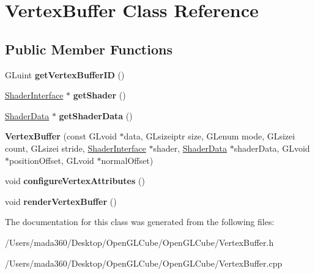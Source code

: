 \hypertarget{class_vertex_buffer}{}\section{Vertex\+Buffer Class Reference}
\label{class_vertex_buffer}
\subsection*{Public Member Functions}
\begin{DoxyCompactItemize}
\item 
\hypertarget{class_vertex_buffer_a58d807701e6c25c15705937b8e699b4d}{}G\+Luint {\bfseries get\+Vertex\+Buffer\+I\+D} ()\label{class_vertex_buffer_a58d807701e6c25c15705937b8e699b4d}

\item 
\hypertarget{class_vertex_buffer_a38b2a3ece59284f1c07020698921f79a}{}\hyperlink{class_shader_interface}{Shader\+Interface} $\ast$ {\bfseries get\+Shader} ()\label{class_vertex_buffer_a38b2a3ece59284f1c07020698921f79a}

\item 
\hypertarget{class_vertex_buffer_a75d299ff5c664c17ccbf076dbddc2dd1}{}\hyperlink{class_shader_data}{Shader\+Data} $\ast$ {\bfseries get\+Shader\+Data} ()\label{class_vertex_buffer_a75d299ff5c664c17ccbf076dbddc2dd1}

\item 
\hypertarget{class_vertex_buffer_a176e74c4c585ce8a70cf8f071c1cbba0}{}{\bfseries Vertex\+Buffer} (const G\+Lvoid $\ast$data, G\+Lsizeiptr size, G\+Lenum mode, G\+Lsizei count, G\+Lsizei stride, \hyperlink{class_shader_interface}{Shader\+Interface} $\ast$shader, \hyperlink{class_shader_data}{Shader\+Data} $\ast$shader\+Data, G\+Lvoid $\ast$position\+Offset, G\+Lvoid $\ast$normal\+Offset)\label{class_vertex_buffer_a176e74c4c585ce8a70cf8f071c1cbba0}

\item 
\hypertarget{class_vertex_buffer_a41eade34b8748926aeda6688fa5f61a7}{}void {\bfseries configure\+Vertex\+Attributes} ()\label{class_vertex_buffer_a41eade34b8748926aeda6688fa5f61a7}

\item 
\hypertarget{class_vertex_buffer_ae522778b0808bb41609ab871e594499f}{}void {\bfseries render\+Vertex\+Buffer} ()\label{class_vertex_buffer_ae522778b0808bb41609ab871e594499f}

\end{DoxyCompactItemize}


The documentation for this class was generated from the following files\+:\begin{DoxyCompactItemize}
\item 
/\+Users/mada360/\+Desktop/\+Open\+G\+L\+Cube/\+Open\+G\+L\+Cube/Vertex\+Buffer.\+h\item 
/\+Users/mada360/\+Desktop/\+Open\+G\+L\+Cube/\+Open\+G\+L\+Cube/Vertex\+Buffer.\+cpp\end{DoxyCompactItemize}
